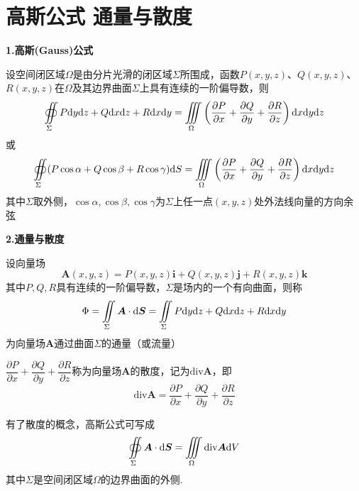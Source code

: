 \section{高斯公式 \quad 通量与散度}
\textbf{1.高斯(Gauss)公式}

设空间闭区域$\Omega$是由分片光滑的闭区域$\Sigma$所围成，函数$P(x,y,z)$、$Q(x,y,z)$、$R(x,y,z)$在$\Omega$及其边界曲面$\Sigma$上具有连续的一阶偏导数，则
\begin{equation*}
    \oiint \limits_{\Sigma}P\mathrm{d} y\mathrm{d} z+Q\mathrm{d} x\mathrm{d} z+R\mathrm{d} x\mathrm{d} y=\iiint \limits_{\Omega}\left(\frac{\partial P}{\partial x}+\frac{\partial Q}{\partial y}+\frac{\partial R}{\partial z}\right)\mathrm{d} x\mathrm{d} y\mathrm{d} z
\end{equation*}
或
\begin{equation*}
    \oiint \limits_{\Sigma}(P\cos\alpha+Q\cos\beta+R\cos\gamma)\mathrm{d} S=\iiint \limits_{\Omega}\left(\frac{\partial P}{\partial x}+\frac{\partial Q}{\partial y}+\frac{\partial R}{\partial z}\right)\mathrm{d} x\mathrm{d} y\mathrm{d} z
\end{equation*}
其中$\Sigma$取外侧，$\cos\alpha,\cos\beta,\cos\gamma$为$\Sigma$上任一点$(x,y,z)$处外法线向量的方向余弦

\textbf{2.通量与散度}

设向量场
\begin{equation*}
    \bm{A}(x,y,z)=P(x,y,z)\bm{i}+Q(x,y,z)\bm{j}+R(x,y,z)\bm{k}
\end{equation*}
其中$P,Q,R$具有连续的一阶偏导数，$\Sigma$是场内的一个有向曲面，则称
\begin{equation*}
    \Phi=\iint \limits_{\Sigma}\bm{A}\cdot\mathrm{d} \bm{S}=\iint \limits_{\Sigma}P\mathrm{d} y\mathrm{d} z+Q\mathrm{d} x\mathrm{d} z+R\mathrm{d} x\mathrm{d} y
\end{equation*}
为向量场$\bm{A}$通过曲面$\Sigma$的通量（或流量）

$\dfrac{\partial P}{\partial x}+\dfrac{\partial Q}{\partial y}+\dfrac{\partial R}{\partial z}$称为向量场$\bm{A}$的散度，记为$\text{div}\bm{A}$，即
\begin{equation*}
    \text{div}\bm{A}=\dfrac{\partial P}{\partial x}+\dfrac{\partial Q}{\partial y}+\dfrac{\partial R}{\partial z}
\end{equation*}

有了散度的概念，高斯公式可写成
\begin{equation*}
    \oiint \limits_{\Sigma}\bm{A}\cdot\mathrm{d} \bm{S}=\iiint \limits_{\Omega}\text{div}\bm{A}\mathrm{d} V
\end{equation*}
其中$\Sigma$是空间闭区域$\Omega$的边界曲面的外侧.

